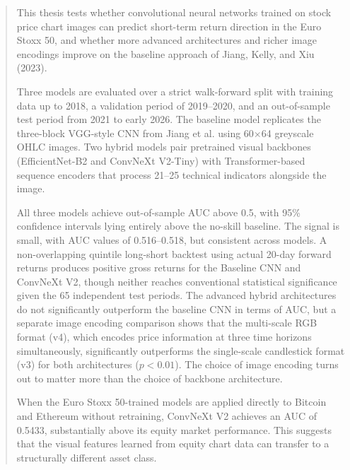 
\begin{abstract}

This thesis tests whether convolutional neural networks trained on stock price chart images can predict short-term return direction in the Euro Stoxx 50, and whether more advanced architectures and richer image encodings improve on the baseline approach of Jiang, Kelly, and Xiu (2023).

Three models are evaluated over a strict walk-forward split with training data up to 2018, a validation period of 2019--2020, and an out-of-sample test period from 2021 to early 2026. The baseline model replicates the three-block VGG-style CNN from Jiang et al. using 60$\times$64 greyscale OHLC images. Two hybrid models pair pretrained visual backbones (EfficientNet-B2 and ConvNeXt V2-Tiny) with Transformer-based sequence encoders that process 21--25 technical indicators alongside the image.

All three models achieve out-of-sample AUC above 0.5, with 95\% confidence intervals lying entirely above the no-skill baseline. The signal is small, with AUC values of 0.516--0.518, but consistent across models. A non-overlapping quintile long-short backtest using actual 20-day forward returns produces positive gross returns for the Baseline CNN and ConvNeXt V2, though neither reaches conventional statistical significance given the 65 independent test periods. The advanced hybrid architectures do not significantly outperform the baseline CNN in terms of AUC, but a separate image encoding comparison shows that the multi-scale RGB format (v4), which encodes price information at three time horizons simultaneously, significantly outperforms the single-scale candlestick format (v3) for both architectures ($p < 0.01$). The choice of image encoding turns out to matter more than the choice of backbone architecture.

When the Euro Stoxx 50-trained models are applied directly to Bitcoin and Ethereum without retraining, ConvNeXt V2 achieves an AUC of 0.5433, substantially above its equity market performance. This suggests that the visual features learned from equity chart data can transfer to a structurally different asset class.

\end{abstract}
